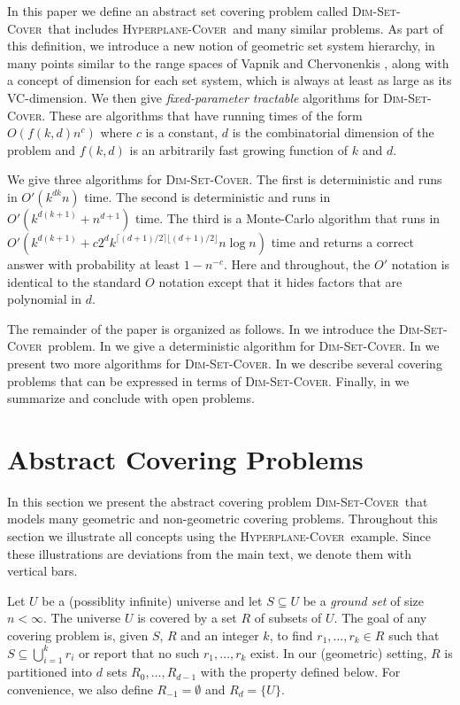 \documentclass[ccfonts,lotsofwhite]{patmorin}
\newcommand{\hppc}{\textsc{Hyperplane-Cover}}
\newcommand{\setcover}{\textsc{Dim-Set-Cover}}
\newcommand{\exponent}{\lceil(d+1)/2\rceil\lfloor(d+1)/2\rfloor}
\newcommand{\runtime}{k^{d(k+1)}+c2^dk^{\exponent}n\log n}
\begin{document}
In this paper we define an abstract set covering problem called
\setcover\ that includes \hppc\ and many similar problems.  As part of
this definition, we introduce a new notion of geometric set system
hierarchy, in many points similar to the range spaces of Vapnik and
Chervonenkis \cite{vc71}, along with a concept of dimension for each
set system, which is always at least as large as its VC-dimension. We
then give \emph{fixed-parameter tractable} algorithms for \setcover.
These are algorithms that have running times of the form
$O(f(k,d)n^c)$ where $c$ is a constant, $d$ is the combinatorial
dimension of the problem and $f(k,d)$ is an arbitrarily fast growing
function of $k$ and $d$.

We give three algorithms for \setcover.  The first is deterministic
and runs in $O'(k^{dk} n)$ time.  The second is deterministic and runs
in $O'(k^{d(k+1)}+n^{d+1})$ time.  The third is a Monte-Carlo algorithm
that runs in $O'(\runtime)$ time and returns a correct answer with
probability at least $1-n^{-c}$.  Here and throughout, the $O'$
notation is identical to the standard $O$ notation except that it
hides factors that are polynomial in $d$.

The remainder of the paper is organized as follows.  In
 we introduce the \setcover\ problem.  In
 we give a deterministic algorithm for
\setcover.  In  we present two more algorithms for
\setcover.  In  we describe several covering
problems that can be expressed in terms of \setcover.  Finally, in
 we summarize and conclude with open problems.

\section{Abstract Covering Problems}

In this section we present the abstract covering problem \setcover\
that models many geometric and non-geometric covering problems.
Throughout this section we illustrate all concepts using the \hppc\
example.  Since these illustrations are deviations from the main text,
we denote them with vertical bars.

Let $U$ be a (possiblity infinite) universe and let $S\subseteq U$ be
a \emph{ground set} of size $n<\infty$.  The universe $U$ is covered
by a set $R$ of subsets of $U$.  The goal of any covering problem is,
given $S$, $R$ and an integer $k$, to find $r_1,\ldots,r_k\in R$ such
that $S\subseteq \bigcup_{i=1}^k r_i$ or report that no such
$r_1,\ldots,r_k$ exist.  In our (geometric) setting, $R$ is
partitioned into $d$ sets $R_0,\ldots,R_{d-1}$ with the property
defined below. For convenience, we also define $R_{-1}=\emptyset$ and
$R_{d}=\{ U\}$.
\end{document}
